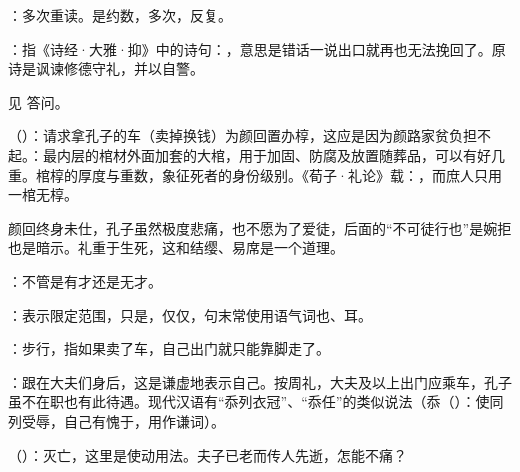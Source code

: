 {
\item {}：多次重读。是约数，多次，反复。 %
\item {}：指《诗经·大雅·抑》中的诗句：，意思是错话一说出口就再也无法挽回了。原诗是讽谏修德守礼，并以自警。
}
{}


{见  答问。}
{}


{
\item {}（）：请求拿孔子的车（卖掉换钱）为颜回置办椁，这应是因为颜路家贫负担不起。：最内层的棺材外面加套的大棺，用于加固、防腐及放置随葬品，可以有好几重。棺椁的厚度与重数，象征死者的身份级别。《荀子·礼论》载：，而庶人只用一棺无椁。

颜回终身未仕，孔子虽然极度悲痛，也不愿为了爱徒，后面的“不可徒行也”是婉拒也是暗示。礼重于生死，这和结缨、易席是一个道理。
\item {}：不管是有才还是无才。
\item {}：表示限定范围，只是，仅仅，句末常使用语气词也、耳。
\item {}：步行，指如果卖了车，自己出门就只能靠脚走了。
\item {}：跟在大夫们身后，这是谦虚地表示自己。按周礼，大夫及以上出门应乘车，孔子虽不在职也有此待遇。现代汉语有“忝列衣冠”、“忝任”的类似说法（忝（）：使同列受辱，自己有愧于，用作谦词）。
}
{}


{
\item {}（）：灭亡，这里是使动用法。夫子已老而传人先逝，怎能不痛？ %
}
{}


